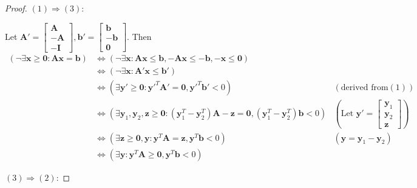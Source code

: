     \begin{proof}
        $(1)\Rightarrow(3)$:
        
        Let $\mathbf{A}'=\left[
        \begin{matrix}
        \mathbf{A} \\
        -\mathbf{A} \\
        -\mathbf{I}
        \end{matrix}
        \right],
        \mathbf{b}'=\left[
        \begin{matrix}
        \mathbf{b} \\
        -\mathbf{b} \\
        \mathbf{0}
        \end{matrix}
        \right]$.
        Then \begin{align*}
        (\neg \exists \mathbf{x}\ge \mathbf{0}: \mathbf{A}\mathbf{x}= \mathbf{b})&\iff(\neg \exists \mathbf{x}: \mathbf{A}\mathbf{x}\le \mathbf{b},-\mathbf{A}\mathbf{x}\le-\mathbf{b},-\mathbf{x}\le \mathbf{0})\\
        &\iff(\neg \exists \mathbf{x}: \mathbf{A}'\mathbf{x}\le \mathbf{b}') \\
        &\iff(\exists \mathbf{y}'\ge \mathbf{0} :\mathbf{y}'^{T}\mathbf{A}'=\mathbf{0},\mathbf{y}'^{T}\mathbf{b}'<0) &(\text{derived from} (1))\\
        &\iff(\exists \mathbf{y}_1,\mathbf{y}_2,\mathbf{z}\ge \mathbf{0}:(\mathbf{y}_{1}^{T}-\mathbf{y}_{2}^{T})\mathbf{A}-\mathbf{z}=\mathbf{0},(\mathbf{y}_{1}^{T}-\mathbf{y}_{2}^{T})\mathbf{b}<0) &(\text{Let }\mathbf{y}'=\left[\begin{matrix} \mathbf{y}_1 \\\mathbf{y}_2 \\\mathbf{z} \end{matrix}\right])\\
        &\iff(\exists \mathbf{z}\ge \mathbf{0}, \mathbf{y}:\mathbf{y}^{T}\mathbf{A}=\mathbf{z},\mathbf{y}^{T}\mathbf{b}<0) &(\mathbf{y}=\mathbf{y}_1-\mathbf{y}_2) \\
        &\iff(\exists \mathbf{y} :\mathbf{y}^{T}\mathbf{A}\ge \mathbf{0},\mathbf{y}^{T}\mathbf{b}<0)
        \end{align*}
        
        $(3)\Rightarrow(2)$:
        

\end{proof}

